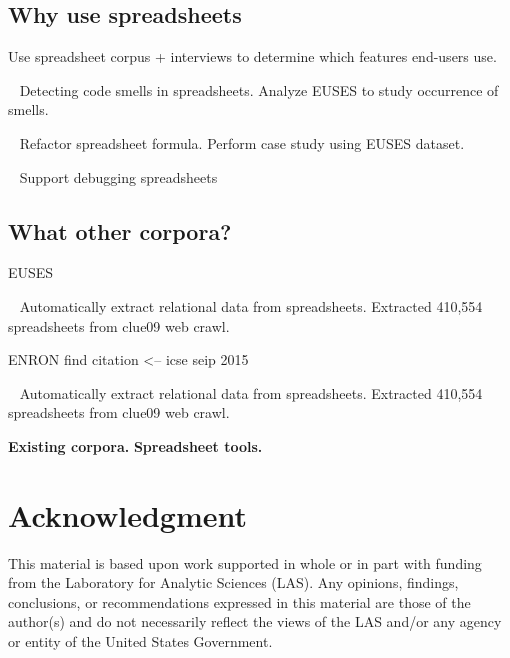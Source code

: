 \documentclass[conference]{IEEEtran}
\begin{document}
\subsection{Why use spreadsheets}

\cite{Chambers2010} Use spreadsheet corpus + interviews to determine which features end-users use.

~\cite{Pinzger2012} Detecting code smells in spreadsheets. Analyze EUSES to study occurrence of smells.

~\cite{Badame2012} Refactor spreadsheet formula. Perform case study using EUSES dataset.

~\cite{Abraham2007} Support debugging spreadsheets

\subsection{What other corpora?}
EUSES~\cite{Fisher2005}

~\cite{Chen2013} Automatically extract relational data from spreadsheets. Extracted 410,554 spreadsheets from clue09 web crawl.

ENRON find citation <-- icse seip 2015



~\cite{Chen2013} Automatically extract relational data from spreadsheets. Extracted 410,554 spreadsheets from clue09 web crawl.


\textbf{Existing corpora.}
\textbf{Spreadsheet tools.}





\section*{Acknowledgment}

This material is based upon work supported in whole or in part with funding from the Laboratory for Analytic Sciences (LAS). Any opinions, findings, conclusions, or recommendations expressed in this material are those of the author(s) and do not necessarily reflect the views of the LAS and/or any agency or entity of the United States Government.



\raggedright




\end{document}
